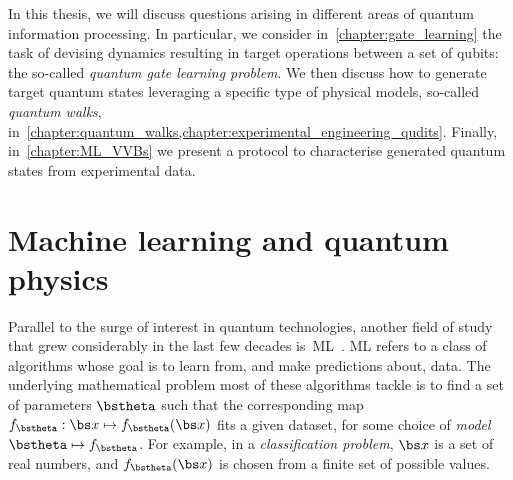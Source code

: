 In this thesis, we will discuss questions arising in different areas of quantum information processing.
In particular, we consider in~\cref{chapter:gate_learning} the task of devising dynamics resulting in target operations between a set of qubits: the so-called \emph{quantum gate learning problem}.
We then discuss how to generate target quantum states leveraging a specific type of physical models, so-called \emph{quantum walks}, in~\cref{chapter:quantum_walks,chapter:experimental_engineering_qudits}.
Finally, in~\cref{chapter:ML_VVBs} we present a protocol to characterise generated quantum states from experimental data.

\section{Machine learning and quantum physics}
\label{sec:intro:ML}

Parallel to the surge of interest in quantum technologies, another field of study that grew considerably in the last few decades is~\ac{ML}~\cite{friedman2001elements,you2011atomic,bishop2006pattern,abu2012learning,murphy2012machine,mehta2019highbias}.
\ac{ML} refers to a class of algorithms whose goal is to learn from, and make predictions about, data.
The underlying mathematical problem most of these algorithms tackle is to find a set of parameters $\bstheta$ such that the corresponding map $f_\bstheta:\bs x\mapsto f_\bstheta(\bs x)$ fits a given dataset, for some choice of \emph{model} $\bstheta\mapsto f_\bstheta$.
For example, in a \emph{classification problem}, $\bs x$ is a set of real numbers, and $f_\bstheta(\bs x)$ is chosen from a finite set of possible values.


